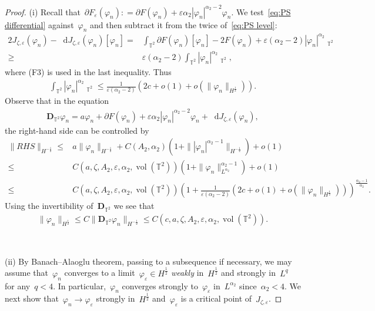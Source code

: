 \documentclass[11pt,final]{amsart}
\newcommand{\T}{\mathbb{T}}
\newcommand{\dd}{\mathop{}\!\mathrm{d}}
\newcommand{\eps}{\varepsilon}
\newcommand{\pD}{\mathbf{D}}
\newcommand{\parenthesis}[1]{\left(#1\right)} %
\DeclareMathOperator{\dv}{\dd{vol}}
\DeclareMathOperator{\vol}{vol}
\begin{document}
\begin{proof}
    (i) Recall that~$\partial F_\eps(\varphi_n): = \partial F(\varphi_n) + \eps\alpha_2|\varphi_n|^{\alpha_2-2}\varphi_n$. 
    We test~\eqref{eq:PS differential} against~$\varphi_n$ and then subtract it from the twice of~\eqref{eq:PS level}:
    \begin{align}\label{eq: the energy functional minus the F-derivative}
    2J_{\zeta,\eps}(\varphi_n)-\dd J_{\zeta,\eps}(\varphi_n)[\varphi_n]
    =&\int_{\T^2}  \partial F(\varphi_n)[\varphi_n]-2F(\varphi_n)+\eps (\alpha_2-2)|\varphi_n|^{\alpha_2}\dv_{\T^2} \\
    \geq & \eps(\alpha_2-2)\int_{\T^2}  |\varphi_n|^{\alpha_2}\dv_{\T^2},
    \end{align}
    where (F3) is used in the last inequality. Thus
    \begin{align}
    \int_{\T^2}  |\varphi_n|^{\alpha_2}\dv_{\T^2} \leq
    \frac{1}{\eps(\alpha_2-2)} \parenthesis{ 2c + o(1) + o(\|\varphi_n\|_{H^{\frac12}})}.
    \end{align}
    Observe that in the equation
    \begin{align}
    \pD_{\T^2} \varphi_n = a\varphi_n + \partial F(\varphi_n) + \eps \alpha_2 |\varphi_n|^{\alpha_2-2}\varphi_n +\dd J_{\zeta,\eps}(\varphi_n),
    \end{align}
    the right-hand side can be controlled by
    \begin{align}
    \| RHS\|_{H^{-\frac{1}{2}}}
    \leq & a \|\varphi_n\|_{H^{-\frac{1}{2}}} +C(A_2,\alpha_2)( 1+\||\varphi_n|^{\alpha_2-1}\|_{H^{-\frac{1}{2}}}) + o(1) \\
    \leq & C(a,\zeta, A_2, \eps, \alpha_2, \vol(\T^2))(1+ \|\varphi_n\|_{L^{\alpha_2}}^{\alpha_2-1})   + o(1) \\
    \leq&  C(a,\zeta, A_2, \eps, \alpha_2, \vol(\T^2)) \parenthesis{1+\frac{1}{\eps(\alpha_2-2)} \parenthesis{ 2c + o(1) + o(\|\varphi_n\|_{H^{\frac12}})}}^{\frac{\alpha_2-1}{\alpha_2}}.
    \end{align}
    Using the invertibility of~$\pD_{\T^2}$ we see that 
    \begin{align}
    \|\varphi_n\|_{H^{\frac{1}{2}}} \leq C \|\pD_{\T^2}\varphi_n\|_{H^{-\frac{1}{2}}}\leq C(c,a,\zeta, A_2, \eps,\alpha_2,\vol(\T^2)).
    \end{align}

    \

    (ii) By Banach--Alaoglu theorem, passing to a subsequence if necessary, we may assume that~$\varphi_n$ converges  to a limit~$\varphi_\eps\in H^{\frac{1}{2}}$ \emph{weakly} in~$H^{\frac{1}{2}}$ and strongly in~$L^q$ for any~$q<4$.
    In particular,~$\varphi_n$ converges strongly to~$\varphi_\eps$ in~$L^{\alpha_2}$ since~$\alpha_2 <4$. 
    We next show that~$\varphi_n\to\varphi_\eps$ strongly in~$H^{\frac{1}{2}}$ and~$\varphi_\eps$ is a critical point of~$J_{\zeta,\eps}$.


\end{proof}
\end{document}
